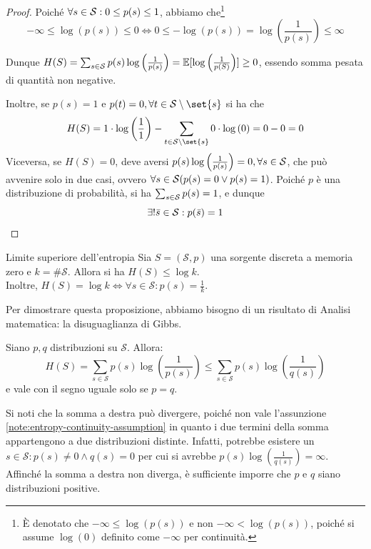 \begin{proof}
  Poiché \(\forall s \in \mathcal{S}: 0\leq p(s) \leq 1\), abbiamo che\footnote{È denotato che \(-\infty \leq \log\left(p(s)\right)\) e non \(-\infty < \log\left(p(s)\right)\), poiché si assume \(\log\left(0\right)\) definito come \(-\infty\) per continuità.}
  \[-\infty \leq \log\left(p(s)\right) \leq 0 \iff  0 \leq -\log\left(p(s)\right) = \log\left(\frac{1}{p(s)}\right) \leq \infty\]

  Dunque \(H(S) = \sum_{s \in \mathcal{S}} p(s) \log\left(\frac{1}{p(s)}\right) = \mathbb{E}[\log\left(\frac{1}{p(S)}\right)] \geq 0\), essendo somma pesata di quantità non negative.

  Inoltre, se \(p(s) = 1\) e \(p(t) = 0, \forall t \in \SCal \setminus \set{s}\) si ha che
  \[H(S) = 1 \cdot \log\left(\frac{1}{1}\right) - \sum_{t \in \SCal \setminus \set{s}} 0 \cdot \log\left(0\right) = 0 - 0 = 0\]
  Viceversa, se \(H(S) = 0\), deve aversi \(p(s) \log\left(\frac{1}{p(s)}\right) = 0, \forall s \in \mathcal{S}\), che può avvenire solo in due casi, ovvero \(\forall s \in \mathcal{S} (p(s) = 0 \lor p(s) = 1)\).
  Poiché \(p\) è una distribuzione di probabilità, si ha \(\sum_{s \in \mathcal{S}} p(s) = 1\), e dunque
  \[\exists!\bar{s} \in \mathcal{S}: p(\bar{s}) = 1\]
\end{proof}

\begin{proposition}[label=prop:upper_bound_entropy]{Limite superiore dell'entropia}
  Sia $S=(\mathcal{S},p)$ una sorgente discreta a memoria zero e $k=\#\mathcal{S}$. Allora si ha $H(S)\leq \log k$.\\
  Inoltre, $H(S)=\log k \iff \forall s \in \mathcal{S}:p(s)=\frac{1}{k}$.
\end{proposition}

Per dimostrare questa proposizione, abbiamo bisogno di un risultato di Analisi matematica: la disuguaglianza di Gibbs.

Siano $p,q$ distribuzioni su $\mathcal{S}$. Allora:
\begin{equation}\label{eq:gibbs}
H(S)=\sum_{s \in \mathcal{S}}{p(s)\log\left( \frac{1}{p(s)} \right)} \leq \sum_{s \in \mathcal{S}}{p(s)\log\left( \frac{1}{q(s)} \right)}
\end{equation}
e vale con il segno uguale solo se $p=q$.

\begin{note}{}
  Si noti che la somma a destra può divergere, poiché non vale l'assunzione \ref{note:entropy-continuity-assumption} in quanto i due termini della somma appartengono a due distribuzioni distinte. Infatti, potrebbe esistere un $s \in \mathcal{S}: p(s) \neq 0 \wedge q(s)=0$ per cui si avrebbe $p(s)\log\left( \frac{1}{q(s)} \right)=\infty$.\\
  Affinché la somma a destra non diverga, è sufficiente imporre che $p$ e $q$ siano distribuzioni positive.
\end{note}

